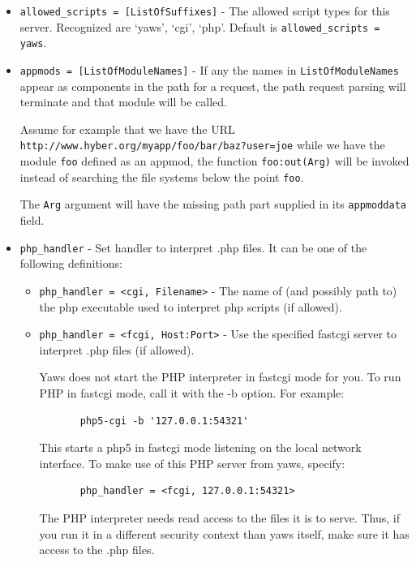 \documentclass[11pt,oneside,english]{book}
\begin{document}
\begin{itemize}
\item       \verb+allowed_scripts = [ListOfSuffixes]+ -
              The allowed script types for this server.  Recognized
              are `yaws', `cgi', `php'.  Default is
              \verb+allowed_scripts = yaws+.

\item       \verb+appmods = [ListOfModuleNames]+ -
              If any the names in \verb+ListOfModuleNames+ appear
              as components in the path for a request, the
              path request parsing will terminate and that
              module will be called.

              Assume  for  example  that  we  have  the  URL
              \verb+http://www.hyber.org/myapp/foo/bar/baz?user=joe+
              while we have the module \verb+foo+ defined  as  an
              appmod,  the  function  \verb+foo:out(Arg)+ will be
              invoked instead of searching the file systems
              below the point \verb+foo+.

              The \verb+Arg+ argument will have the missing path
              part supplied in its \verb+appmoddata+ field.

\item       \verb+php_handler+ -
              Set handler to interpret .php files. It can be one of the
              following definitions:

              \begin{itemize}
              \item \verb+php_handler = <cgi, Filename>+ - The name of (and possibly
                path to) the php executable used to interpret php scripts (if
                allowed).
              \item \verb+php_handler = <fcgi, Host:Port>+ - Use the specified
                fastcgi server to interpret .php files (if allowed).

                Yaws does not start the PHP interpreter in fastcgi mode for
                you. To run PHP in fastcgi mode, call it with the -b option. For
                example:
\begin{verbatim}
       php5-cgi -b '127.0.0.1:54321'
\end{verbatim}
                This starts a php5 in fastcgi mode listening on the local
                network interface. To make use of this PHP server from yaws,
                specify:
\begin{verbatim}
       php_handler = <fcgi, 127.0.0.1:54321>
\end{verbatim}
                The PHP interpreter needs read access to the files it is to
                serve. Thus, if you run it in a different security context than
                yaws itself, make sure it has access to the .php files.


\end{itemize}
\end{itemize}
\end{document}
